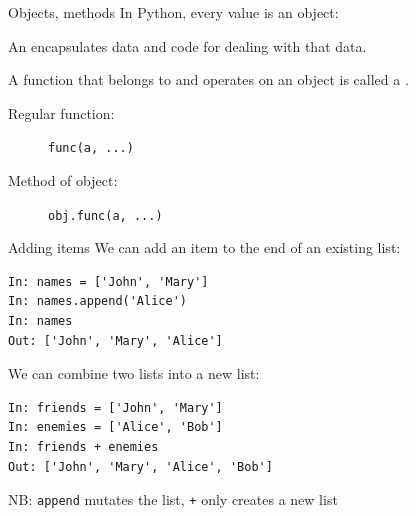 \documentclass[aspectratio=169,usenames,dvipsnames]{beamer}
\begin{document}
\begin{frame}{Objects, methods}
    In Python, every value is an object:

    \begin{definition}
        An  encapsulates
        data and code for dealing with that data.

        A function that belongs to and operates on an object
        is called a .
    \end{definition}
   
    \begin{description}
        \item[Regular function:] \lstinline{func(a, ...)}
        \item[Method of object:] \lstinline{obj.func(a, ...)}
    \end{description}
\end{frame}

\begin{frame}[fragile]{Adding items}
We can add an item to the end of an existing list:
\begin{lstlisting} 
In: names = ['John', 'Mary']
In: names.append('Alice')
In: names
Out: ['John', 'Mary', 'Alice']
\end{lstlisting}

\pause
We can combine two lists into a new list:
\begin{lstlisting} 
In: friends = ['John', 'Mary']
In: enemies = ['Alice', 'Bob']
In: friends + enemies
Out: ['John', 'Mary', 'Alice', 'Bob']
\end{lstlisting}

\vspace{1em}
NB: \lstinline{append} mutates the list, \lstinline{+} only creates a new list
\end{frame}
\end{document}
